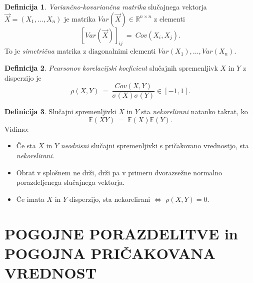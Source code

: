\documentclass[11pt]{article}
\newcommand{\E}{\mathbb{E}}
\newcommand{\R}{\mathbb{R}}
\newcommand{\1}{\mathbbm{1}}
\theoremstyle{definition}
\newtheorem{definicija}{Definicija}[section]
\theoremstyle{definition}
\theoremstyle{definition}
\begin{document}
\begin{definicija}

\textit{Variančno-kovariančna matrika} slučajnega vektorja $\vec{X} = (X_1, \ldots, X_n)$ je matrika $Var(\vec{X}) \in \R^{n \times n}$ z elementi
$$[Var(\vec{X})]_{ij} ~=~ Cov(X_i, X_j).$$
To je \textit{simetrična} matrika z diagonalnimi elementi $Var(X_1), \ldots, Var(X_n)$.

\end{definicija}
\vspace{0.5cm}

\begin{definicija}

\textit{Pearsonov korelacijski koeficient} slučajnih spremenljivk $X$ in $Y$ z disperzijo je
$$\rho(X, Y) ~=~ \frac{Cov(X, Y)}{\sigma(X)\sigma(Y)} \in [-1, 1].$$

\end{definicija}
\vspace{0.5cm}

\begin{definicija}

Slučajni spremenljivki $X$ in $Y$ sta \textit{nekorelirani} natanko takrat, ko
$$\E(XY) ~=~ \E(X)\E(Y).$$
Vidimo:
\begin{itemize}
	\item Če sta $X$ in $Y$ \textit{neodvisni} slučajni spremenljivki s pričakovano vrednostjo, sta \textit{nekorelirani}.
	
	\item Obrat v splošnem ne drži, drži pa v primeru dvorazsežne normalno porazdeljenega slučajnega vektorja.
	
	\item Če imata $X$ in $Y$ disperzijo, sta nekorelirani $\iff$ $\rho(X, Y) = 0$.
\end{itemize}

\end{definicija}
\vspace{0.5cm}


\pagebreak


\section{POGOJNE PORAZDELITVE in \\POGOJNA PRIČAKOVANA VREDNOST}
\vspace{0.5cm}
\end{document}
